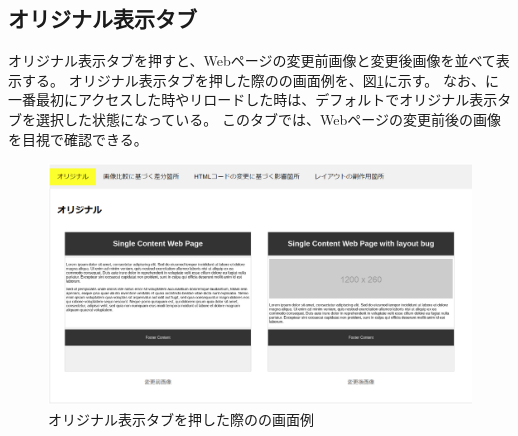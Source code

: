 \subsection{オリジナル表示タブ}\label{subsec:original_tab}
オリジナル表示タブを押すと、Webページの変更前画像と変更後画像を並べて表示する。
オリジナル表示タブを押した際の\toolName の画面例を、図\ref{fig: Appearance_original_tab}に示す。
なお、\toolName に一番最初にアクセスした時やリロードした時は、デフォルトでオリジナル表示タブを選択した状態になっている。
このタブでは、Webページの変更前後の画像を目視で確認できる。
\begin{figure}[tp]
    \begin{center}
        \includegraphics[width=1.0\columnwidth]{image/3_original_tab.png}
        \caption{オリジナル表示タブを押した際の\toolName の画面例}
        \label{fig: Appearance_original_tab}
    \end{center}
\end{figure}



